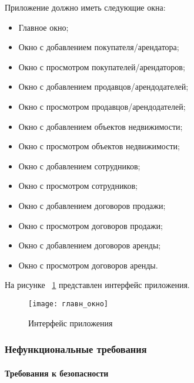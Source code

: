 Приложение должно иметь следующие окна:
\begin{itemize}
\item	Главное окно;

\item	Окно с добавлением покупателя/арендатора;

\item	Окно с просмотром покупателей/арендаторов;

\item	Окно с добавлением продавцов/арендодателей;

\item	Окно с просмотром продавцов/арендодателей;

\item	Окно с добавлением объектов недвижимости;

\item	Окно с просмотром объектов недвижимости;

\item	Окно с добавлением сотрудников;

\item	Окно с просмотром сотрудников;

\item	Окно с добавлением договоров продажи;

\item	Окно с просмотром договоров продажи;

\item	Окно с добавлением договоров аренды;

\item	Окно с просмотром договоров аренды.
\end{itemize}
\clearpage

На рисунке ~\ref{gl_okno:image} представлен интерфейс приложения.

\begin{figure}[H]
	\texttt{[image: главн\_окно]}
	\caption{Интерфейс приложения}
	\label{gl_okno:image}
\end{figure}


\subsubsection{Нефункциональные требования}

\paragraph{Требования к безопасности}

